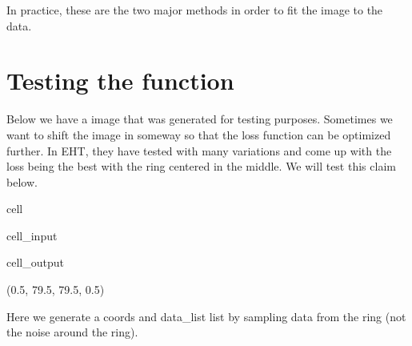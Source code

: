 \documentclass[letterpaper,10pt,english]{jupyterBook}
\begin{document}
\sphinxAtStartPar
In practice, these are the two major methods in order to fit the image to the data.


\section{Testing the function}
\label{\detokenize{loss:testing-the-function}}
\sphinxAtStartPar
Below we have a image that was generated for testing purposes. Sometimes we want to shift the image in someway so that the loss function can be optimized further. In EHT, they have tested with many variations and come up with the loss being the best with the ring centered in the middle. We will test this claim below.

\begin{sphinxuseclass}{cell}\begin{sphinxVerbatimInput}

\begin{sphinxuseclass}{cell_input}
\begin{sphinxVerbatim}[commandchars=\\\{\}]
   
\end{sphinxVerbatim}

\end{sphinxuseclass}\end{sphinxVerbatimInput}
\begin{sphinxVerbatimOutput}

\begin{sphinxuseclass}{cell_output}
\begin{sphinxVerbatim}[commandchars=\\\{\}]
(\PYGZhy{}0.5, 79.5, 79.5, \PYGZhy{}0.5)
\end{sphinxVerbatim}

\noindent{}

\end{sphinxuseclass}\end{sphinxVerbatimOutput}

\end{sphinxuseclass}
\sphinxAtStartPar
Here we generate a coords and data\_list list by sampling data from the ring (not the noise around the ring).
\end{document}
